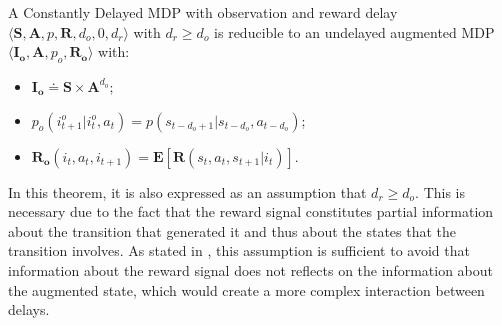                 \begin{theorem}
                    \label{th:dmdpobsred_v1}
                    A Constantly Delayed MDP with observation and reward delay $\langle \mathbf{S}, \mathbf{A}, p, \mathbf{R}, d_o, 0, d_r \rangle$ with $d_r \geq d_o$ is reducible to an undelayed augmented MDP $\langle \mathbf{I_o}, \mathbf{A}, p_o, \mathbf{R_o} \rangle$ with: 
                    \begin{itemize}[topsep=0.5em, partopsep=0.5em]
                        \setlength\itemsep{0em}
                        \item $\mathbf{I_{o}} \doteq \mathbf{S} \times \mathbf{A}^{d_o}$;
                        \item $p_o \left( i_{t+1}^o | i_t^o , a_t  \right) = p ( s_{t-d_{o}+1} | s_{t-d_{o}}, a_{t-d_{o}})$;
                        \item $\mathbf{R_{o}}\left( i_t, a_{t}, i_{t+1} \right) = \mathbf{E} \left[ \mathbf{R} \left( s_t, a_t, s_{t+1} | i_t \right) \right]$.
                    \end{itemize}
                \end{theorem}
                
                In this theorem, it is also expressed as an assumption that $d_r \geq d_o$. This is necessary due to the fact that the reward signal constitutes partial information about the transition that generated it and thus about the states that the transition involves. As stated in , this assumption is sufficient to avoid that information about the reward signal does not reflects on the information about the augmented state, which would create a more complex interaction between delays.
                
